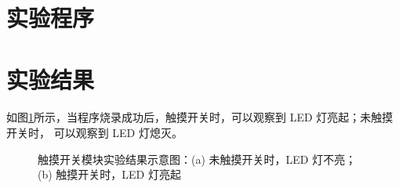 \documentclass[UTF8, oneside]{ctexbook}
\begin{document}
\section{实验程序}


\section{实验结果}
\paragraph{}
如图\ref{s7_1}所示，当程序烧录成功后，触摸开关时，可以观察到 LED 灯亮起；未触摸开关时，
可以观察到 LED 灯熄灭。
\newpage
\begin{figure}[h]
    \centering


    \centering
    \caption{触摸开关模块实验结果示意图：(a) 未触摸开关时，LED 灯不亮；(b) 触摸开关时，LED 灯亮起}
    \label{s7_1}
    
\end{figure}
\end{document}
